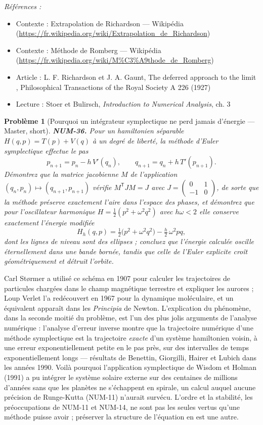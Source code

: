 \documentclass[11pt]{article}
\newtheorem{problem}{Problème}
\newenvironment{refs}{\par\small\noindent\emph{Références :}\begin{itemize}\setlength\itemsep{0pt}}{\end{itemize}\normalsize}
\begin{document}
\begin{refs}
\item Contexte : Extrapolation de Richardson --- Wikipédia (\url{https://fr.wikipedia.org/wiki/Extrapolation_de_Richardson})
\item Contexte : Méthode de Romberg --- Wikipédia (\url{https://fr.wikipedia.org/wiki/M%C3%A9thode_de_Romberg})
\item Article : L. F. Richardson et J. A. Gaunt, \og{} The deferred approach to the limit \fg{}, Philosophical Transactions of the Royal Society A 226 (1927)
\item Lecture : Stoer et Bulirsch, \textit{Introduction to Numerical Analysis}, ch. 3
\end{refs}

\bigskip

\begin{problem}[{Pourquoi un intégrateur symplectique ne perd jamais d'énergie --- Master, short}]
\textbf{NUM-36.} Pour un hamiltonien séparable $H(q,p) = T(p) + V(q)$ à un degré de liberté, la méthode d'Euler symplectique effectue le pas
\[ p_{n+1} = p_n - h\,V'(q_n), \qquad q_{n+1} = q_n + h\,T'(p_{n+1}). \]
Démontrez que la matrice jacobienne $M$ de l'application $(q_n,p_n) \mapsto (q_{n+1},p_{n+1})$ vérifie $M^{\mathsf T} J M = J$ avec $J = \begin{pmatrix} 0 & 1 \\ -1 & 0\end{pmatrix}$, de sorte que la méthode préserve exactement l'aire dans l'espace des phases, et démontrez que pour l'oscillateur harmonique $H = \tfrac12(p^2 + \omega^2 q^2)$ avec $h\omega < 2$ elle conserve exactement l'énergie modifiée
\[ H_h(q,p) = \tfrac12\big(p^2 + \omega^2 q^2\big) - \tfrac{h}{2}\,\omega^2 p q, \]
dont les lignes de niveau sont des ellipses ; concluez que l'énergie calculée oscille éternellement dans une bande bornée, tandis que celle de l'Euler explicite croît géométriquement et détruit l'orbite.
\end{problem}

\noindent Carl Størmer a utilisé ce schéma en 1907 pour calculer les trajectoires de particules chargées dans le champ magnétique terrestre et expliquer les aurores ; Loup Verlet l'a redécouvert en 1967 pour la dynamique moléculaire, et un équivalent apparaît dans les \textit{Principia} de Newton. L'explication du phénomène, dans la seconde moitié du problème, est l'un des plus jolis arguments de l'analyse numérique : l'analyse d'erreur inverse montre que la trajectoire numérique d'une méthode symplectique est la trajectoire \textit{exacte} d'un système hamiltonien voisin, à une erreur exponentiellement petite en le pas près, sur des intervalles de temps exponentiellement longs --- résultats de Benettin, Giorgilli, Hairer et Lubich dans les années 1990. Voilà pourquoi l'application symplectique de Wisdom et Holman (1991) a pu intégrer le système solaire externe sur des centaines de millions d'années sans que les planètes ne s'échappent en spirale, un calcul auquel aucune précision de Runge-Kutta (NUM-11) n'aurait survécu. L'ordre et la stabilité, les préoccupations de NUM-11 et NUM-14, ne sont pas les seules vertus qu'une méthode puisse avoir ; préserver la structure de l'équation en est une autre.
\end{document}
